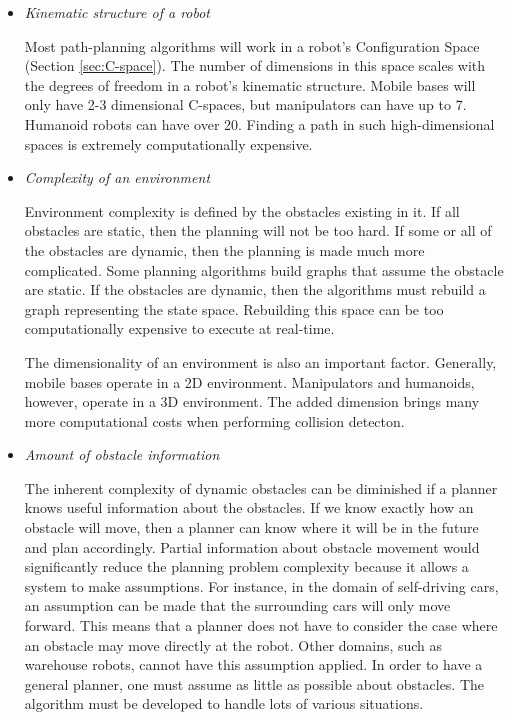 \documentclass[10pt,conference]{ieeeconf}
\begin{document}
	\begin{itemize}
	\item \emph{Kinematic structure of a robot}
	
	Most path-planning algorithms will work in a robot's Configuration Space (Section \ref{sec:C-space}). The number of dimensions in this space scales with the degrees of freedom in a robot's kinematic structure. Mobile bases will only have 2-3 dimensional C-spaces, but manipulators can have up to 7. Humanoid robots can have over 20. Finding a path in such high-dimensional spaces is extremely computationally expensive. 
	
	\item \emph{Complexity of an environment}
	
	Environment complexity is defined by the obstacles existing in it. If all obstacles are static, then the planning will not be too hard. If some or all of the obstacles are dynamic, then the planning is made much more complicated. Some planning algorithms build graphs that assume the obstacle are static. If the obstacles are dynamic, then the algorithms must rebuild a graph representing the state space. Rebuilding this space can be too computationally expensive to execute at real-time. 
	
	The dimensionality of an environment is also an important factor. Generally, mobile bases operate in a 2D environment. Manipulators and humanoids, however, operate in a 3D environment. The added dimension brings many more computational costs when performing collision detecton.
	
	\item \emph{Amount of obstacle information}
	
	The inherent complexity of dynamic obstacles can be diminished if a planner knows useful information about the obstacles. If we know exactly how an obstacle will move, then a planner can know where it will be in the future and plan accordingly. Partial information about obstacle movement would significantly reduce the planning problem complexity because it allows a system to make assumptions. For instance, in the domain of self-driving cars, an assumption can be made that the surrounding cars will only move forward. This means that a planner does not have to consider the case where an obstacle may move directly at the robot. Other domains, such as warehouse robots, cannot have this assumption applied. In order to have a general planner, one must assume as little as possible about obstacles. The algorithm must be developed to handle lots of various situations.
	

	
	\end{itemize}
	
\end{document}
